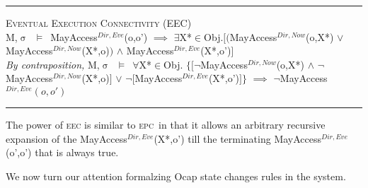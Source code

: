 \documentclass[a4paper,11pt, twoside,twocolumn]{article}
\newenvironment{logic}[1][null]
{\begin{flushleft} \small \label{#1}}
{\end{flushleft}}
\newcommand{\loin}{$\in$}
\newcommand{\loforall}{$\forall$}
\newcommand{\loexists}{$\exists$}
\newcommand{\loand}{$\land$}
\newcommand{\loor} {$\lor$}
\newcommand{\loimplies}{$\implies$}
\newcommand{\losigma}{$\upsigma$}
\newcommand{\loturns} {$\vDash$}
\newcommand{\loneg}{$\boldsymbol \neg$}
\newcommand{\ablock} {\null\qquad}
\begin{document}
\begin{logic}
\hrule\null
\textsc{\normalsize *Eventual Execution Connectivity (EEC)}\\
M,\losigma\ \loturns\ MayAccess$^{Dir,Eve}$(o,o')\linebreak
\ablock \loimplies\linebreak
\ablock \loexists X*\loin Obj.$[($MayAccess$^{Dir,Now}$(o,X*) \loor \linebreak
\ablock \ablock \ablock \ablock MayAccess$^{Dir,Now}$(X*,o)$)$\linebreak
\ablock \ablock \ablock \ablock \loand \linebreak
\ablock \ablock \ablock \ablock MayAccess$^{Dir,Eve}$(X*,o')$]$
\linebreak \\
\textit{By contraposition,}\linebreak
M,\losigma\ \loturns\ 
\loforall X*\loin Obj. $\{[$\loneg MayAccess$^{Dir,Now}$(o,X*) \loand \linebreak
\ablock \ablock \ablock \ablock \quad \loneg MayAccess$^{Dir,Now}$(X*,o)$]$\linebreak
\ablock \ablock \ablock \ablock \loor \linebreak
\ablock \ablock \ablock \ablock \loneg $[$MayAccess$^{Dir,Eve}$(X*,o')$]\}$\linebreak
\ablock \loimplies\linebreak
	\ablock\loneg MayAccess$^{Dir,Eve}(o,o')$\linebreak
\hrule
\end{logic}
The power of \textsc{eec} is similar to \textsc{epc}\ in that it allows an arbitrary recursive expansion of the MayAccess$^{Dir,Eve}$(X*,o') till the terminating MayAccess$^{Dir,Eve}$(o',o') that is always true.

We now turn our attention formalzing Ocap state changes rules in the system.\\
\end{document}
